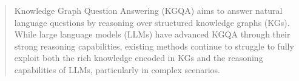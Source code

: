 \documentclass[sigconf]{acmart}
\begin{document}
\begin{abstract}
Knowledge Graph Question Answering (KGQA) aims to answer natural language questions by reasoning over structured knowledge graphs (KGs). While large language models (LLMs) have advanced KGQA through their strong reasoning capabilities, existing methods continue to struggle to fully exploit both the rich knowledge encoded in KGs and the reasoning capabilities of LLMs, particularly in complex scenarios. 

\end{abstract}
\end{document}
